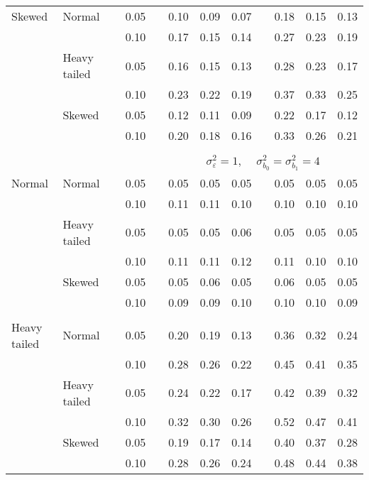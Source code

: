 \begin{table}[ht]
\begin{scriptsize}
\begin{tabular}{ll p{.1cm} c p{.1cm} rrr p{.1cm} rrr}
Skewed       & Normal       && 0.05 &&  0.10 & 0.09 & 0.07 && 0.18 & 0.15 & 0.13 \\ 
             &              && 0.10 &&  0.17 & 0.15 & 0.14 && 0.27 & 0.23 & 0.19 \\ 
             & Heavy tailed && 0.05 &&  0.16 & 0.15 & 0.13 && 0.28 & 0.23 & 0.17 \\ 
             &              && 0.10 &&  0.23 & 0.22 & 0.19 && 0.37 & 0.33 & 0.25 \\ 
             & Skewed       && 0.05 &&  0.12 & 0.11 & 0.09 && 0.22 & 0.17 & 0.12 \\ 
             &              && 0.10 &&  0.20 & 0.18 & 0.16 && 0.33 & 0.26 & 0.21 \\ 


&&&&&&&&&&&\\
& && && \multicolumn{7}{c}{$\sigma_{\varepsilon}^2 = 1$, \ \ $\sigma_{b_0}^2 = \sigma_{b_1}^2 = 4$} \\ \cline{6-12}
\rowcolor{gray!20}Normal       & Normal       && 0.05 &&  0.05 & 0.05 & 0.05 && 0.05 & 0.05 & 0.05 \\ 
\rowcolor{gray!20}             &              && 0.10 &&  0.11 & 0.11 & 0.10 && 0.10 & 0.10 & 0.10 \\ 
\rowcolor{gray!20}             & Heavy tailed && 0.05 &&  0.05 & 0.05 & 0.06 && 0.05 & 0.05 & 0.05 \\ 
\rowcolor{gray!20}             &              && 0.10 &&  0.11 & 0.11 & 0.12 && 0.11 & 0.10 & 0.10 \\ 
\rowcolor{gray!20}             & Skewed       && 0.05 &&  0.05 & 0.06 & 0.05 && 0.06 & 0.05 & 0.05 \\ 
\rowcolor{gray!20}             &              && 0.10 &&  0.09 & 0.09 & 0.10 && 0.10 & 0.10 & 0.09 \\ 
             &&&&&&&&&&&\\
Heavy tailed & Normal       && 0.05 &&  0.20 & 0.19 & 0.13 && 0.36 & 0.32 & 0.24 \\ 
             &              && 0.10 &&  0.28 & 0.26 & 0.22 && 0.45 & 0.41 & 0.35 \\ 
             & Heavy tailed && 0.05 &&  0.24 & 0.22 & 0.17 && 0.42 & 0.39 & 0.32 \\ 
             &              && 0.10 &&  0.32 & 0.30 & 0.26 && 0.52 & 0.47 & 0.41 \\ 
             & Skewed       && 0.05 &&  0.19 & 0.17 & 0.14 && 0.40 & 0.37 & 0.28 \\ 
             &              && 0.10 &&  0.28 & 0.26 & 0.24 && 0.48 & 0.44 & 0.38 \\ 

\end{tabular}
\end{scriptsize}
\end{table}
